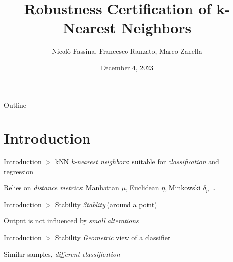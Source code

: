 \documentclass[11pt]{beamer}
\author[Fassina, Ranzato, Zanella]{Nicolò Fassina, Francesco Ranzato, Marco Zanella}
\title[Robustness of kNN]{Robustness Certification of k-Nearest Neighbors}
\institute[Univ. Padova]{University of Padova}
\date{December 4, 2023}
\begin{document}
\begin{frame}
\titlepage
\end{frame}

\begin{frame}{Outline}
\tableofcontents
\end{frame}

\section{Introduction}
\begin{frame}{Introduction $>$ kNN}
\emph{k-nearest neighbors}: suitable for \emph{classification} and regression

\begin{center}
 
\end{center}

Relies on \emph{distance metrics}: Manhattan $\mu$, Euclidean $\eta$, Minkowski $\delta_p$ \ldots
\end{frame}

\begin{frame}{Introduction $>$ Stability}
\emph{Stablity} (around a point)

\begin{center}
 
\end{center}

Output is not influenced by \emph{small alterations}
\end{frame}

\begin{frame}{Introduction $>$ Stability}
\emph{Geometric} view of a classifier

\begin{center}
 
\end{center}

Similar samples, \emph{different classification}
\end{frame}
\end{document}
